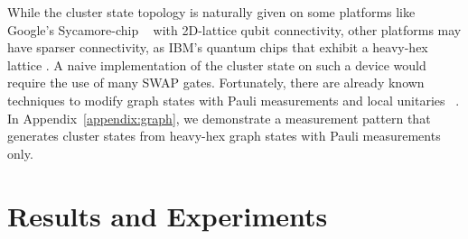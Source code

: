 \documentclass[../main.tex]{subfiles}
\begin{document}
While the cluster state topology is naturally given on some platforms like Google's Sycamore-chip ~\cite{arute2019quantum} with 2D-lattice qubit connectivity, other platforms may have sparser connectivity, as IBM's quantum chips that exhibit a heavy-hex lattice \cite{hertzberg2020laser}. A naive implementation of the cluster state on such a device would require the use of many SWAP gates. Fortunately, there are already known techniques to modify graph states with Pauli measurements and local unitaries ~\cite{anders2006fast,hein2006entanglement}. In Appendix~\ref{appendix:graph}, we demonstrate a measurement pattern that generates cluster states from heavy-hex graph states with Pauli measurements only. 

\section{Results and Experiments}
\end{document}
